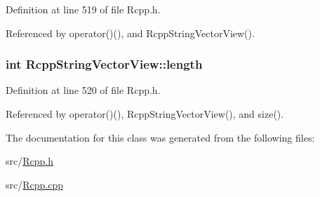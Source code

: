 Definition at line 519 of file Rcpp.h.

Referenced by operator()(), and RcppStringVectorView().\hypertarget{classRcppStringVectorView_ef6edaa52c234b4bb1fd1fc949fa0f25}{
\subsubsection[length]{\setlength{\rightskip}{0pt plus 5cm}int {\bf RcppStringVectorView::length}}}
\label{classRcppStringVectorView_ef6edaa52c234b4bb1fd1fc949fa0f25}




Definition at line 520 of file Rcpp.h.

Referenced by operator()(), RcppStringVectorView(), and size().

The documentation for this class was generated from the following files:\begin{CompactItemize}
\item 
src/\hyperlink{Rcpp_8h}{Rcpp.h}\item 
src/\hyperlink{Rcpp_8cpp}{Rcpp.cpp}\end{CompactItemize}

